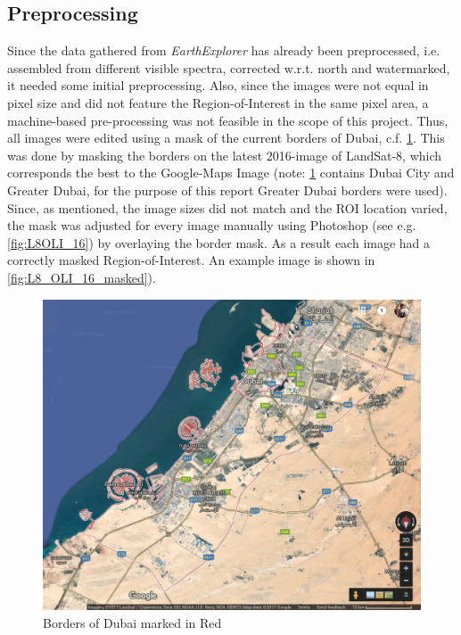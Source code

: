 \subsection{Preprocessing}
\label{subsec:pre}
Since the data gathered from \textit{EarthExplorer} has already been preprocessed, i.e. assembled from different visible spectra, corrected w.r.t. north and watermarked, it needed some initial preprocessing. Also, since the images were not equal in pixel size and did not feature the Region-of-Interest in the same pixel area, a machine-based pre-processing was not feasible in the scope of this project. Thus, all images were edited using a mask of the current borders of Dubai, c.f. \cref{fig:borders}. This was done by masking the borders on the latest 2016-image of LandSat-8, which corresponds the best to the Google-Maps Image (note: \cref{fig:borders} contains Dubai City and Greater Dubai, for the purpose of this report Greater Dubai borders were used). Since, as mentioned, the image sizes did not match and the ROI location varied, the mask was adjusted for every image manually using Photoshop (see e.g. \cref{fig:L8OLI_16}) by overlaying the border mask. As a result each image had a correctly masked Region-of-Interest. An example image is shown in \cref{fig:L8_OLI_16_masked}).
\begin{figure}[h!]
	\centering
	\includegraphics[width=\textwidth]{images/google_dubai.png}
	\caption{Borders of Dubai marked in Red\protect\footnotemark}
	\label{fig:borders}
\end{figure}


